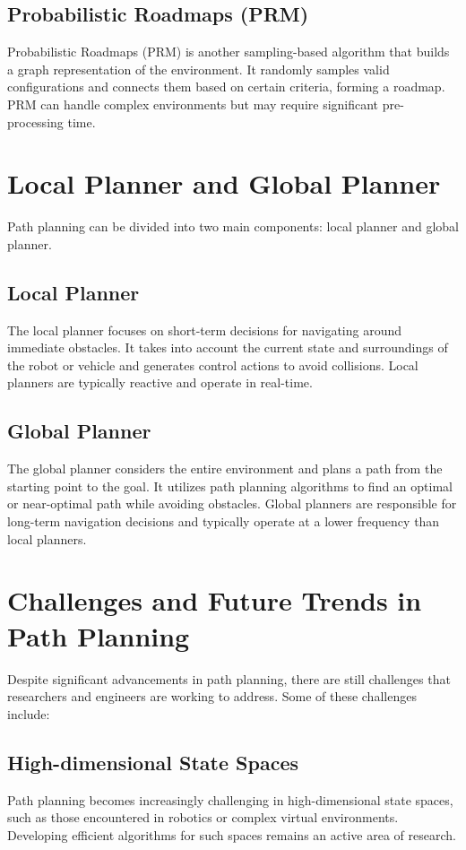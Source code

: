 \documentclass{article}
\begin{document}
\subsection{Probabilistic Roadmaps (PRM)} 
Probabilistic Roadmaps (PRM) is another sampling-based algorithm that builds a graph representation of the environment. It randomly samples valid configurations and connects them based on certain criteria, forming a roadmap. PRM can handle complex environments but may require significant pre-processing time. 
 
\section{Local Planner and Global Planner} 
Path planning can be divided into two main components: local planner and global planner. 
\subsection{Local Planner} 
The local planner focuses on short-term decisions for navigating around immediate obstacles. It takes into account the current state and surroundings of the robot or vehicle and generates control actions to avoid collisions. Local planners are typically reactive and operate in real-time. 
 
\subsection{Global Planner} 
The global planner considers the entire environment and plans a path from the starting point to the goal. It utilizes path planning algorithms to find an optimal or near-optimal path while avoiding obstacles. Global planners are responsible for long-term navigation decisions and typically operate at a lower frequency than local planners. 
 
\section{Challenges and Future Trends in Path Planning} 
Despite significant advancements in path planning, there are still challenges that researchers and engineers are working to address. Some of these challenges include: 
 
\subsection{High-dimensional State Spaces} 
Path planning becomes increasingly challenging in high-dimensional state spaces, such as those encountered in robotics or complex virtual environments. Developing efficient algorithms for such spaces remains an active area of research. 
 
\end{document}
